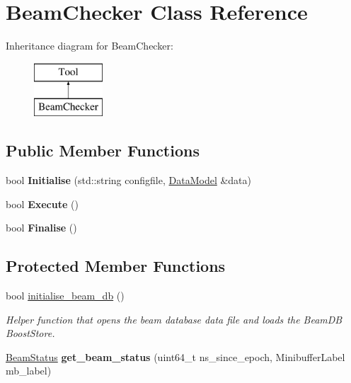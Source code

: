 \hypertarget{classBeamChecker}{\section{Beam\-Checker Class Reference}
\label{classBeamChecker}
}
Inheritance diagram for Beam\-Checker\-:\begin{figure}[H]
\begin{center}
\leavevmode
\includegraphics[height=2.000000cm]{classBeamChecker}
\end{center}
\end{figure}
\subsection*{Public Member Functions}
\begin{DoxyCompactItemize}
\item 
\hypertarget{classBeamChecker_a8025fea06b24c363f17764b3cc049ebd}{bool {\bfseries Initialise} (std\-::string configfile, \hyperlink{classDataModel}{Data\-Model} \&data)}\label{classBeamChecker_a8025fea06b24c363f17764b3cc049ebd}

\item 
\hypertarget{classBeamChecker_a9fd96575f736c2a0a90e9b18fca3bdf7}{bool {\bfseries Execute} ()}\label{classBeamChecker_a9fd96575f736c2a0a90e9b18fca3bdf7}

\item 
\hypertarget{classBeamChecker_a1f9078a610f387f97dc6d17a6b98f493}{bool {\bfseries Finalise} ()}\label{classBeamChecker_a1f9078a610f387f97dc6d17a6b98f493}

\end{DoxyCompactItemize}
\subsection*{Protected Member Functions}
\begin{DoxyCompactItemize}
\item 
\hypertarget{classBeamChecker_a85643380e26692a3fad55cc4e7d4ea1b}{bool \hyperlink{classBeamChecker_a85643380e26692a3fad55cc4e7d4ea1b}{initialise\-\_\-beam\-\_\-db} ()}\label{classBeamChecker_a85643380e26692a3fad55cc4e7d4ea1b}

\begin{DoxyCompactList}\small\item\em Helper function that opens the beam database data file and loads the Beam\-D\-B Boost\-Store. \end{DoxyCompactList}\item 
\hypertarget{classBeamChecker_a40e731049d58aa141a15f3431b00a764}{\hyperlink{classBeamStatus}{Beam\-Status} {\bfseries get\-\_\-beam\-\_\-status} (uint64\-\_\-t ns\-\_\-since\-\_\-epoch, Minibuffer\-Label mb\-\_\-label)}\label{classBeamChecker_a40e731049d58aa141a15f3431b00a764}

\end{DoxyCompactItemize}
